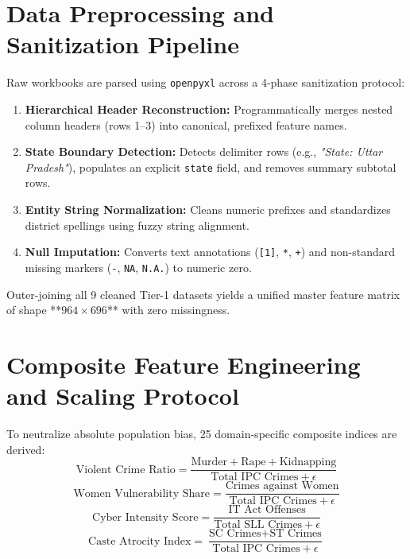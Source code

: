 \documentclass[12pt,a4paper]{report}
\begin{document}
\section{Data Preprocessing and Sanitization Pipeline}
Raw workbooks are parsed using \texttt{openpyxl} across a 4-phase sanitization protocol:
\begin{enumerate}[leftmargin=*]
    \item \textbf{Hierarchical Header Reconstruction:} Programmatically merges nested column headers (rows 1--3) into canonical, prefixed feature names.
    \item \textbf{State Boundary Detection:} Detects delimiter rows (e.g., \textit{"State: Uttar Pradesh"}), populates an explicit \texttt{state} field, and removes summary subtotal rows.
    \item \textbf{Entity String Normalization:} Cleans numeric prefixes and standardizes district spellings using fuzzy string alignment.
    \item \textbf{Null Imputation:} Converts text annotations (\texttt{[1]}, \texttt{*}, \texttt{+}) and non-standard missing markers (\texttt{-}, \texttt{NA}, \texttt{N.A.}) to numeric zero.
\end{enumerate}
Outer-joining all 9 cleaned Tier-1 datasets yields a unified master feature matrix of shape **$964 \times 696$** with zero missingness.

\section{Composite Feature Engineering and Scaling Protocol}
To neutralize absolute population bias, 25 domain-specific composite indices are derived:
\begin{equation}
\text{Violent Crime Ratio} = \frac{\text{Murder} + \text{Rape} + \text{Kidnapping}}{\text{Total IPC Crimes} + \epsilon}
\end{equation}
\begin{equation}
\text{Women Vulnerability Share} = \frac{\text{Crimes against Women}}{\text{Total IPC Crimes} + \epsilon}
\end{equation}
\begin{equation}
\text{Cyber Intensity Score} = \frac{\text{IT Act Offenses}}{\text{Total SLL Crimes} + \epsilon}
\end{equation}
\begin{equation}
\text{Caste Atrocity Index} = \frac{\text{SC Crimes} + \text{ST Crimes}}{\text{Total IPC Crimes} + \epsilon}
\end{equation}
\end{document}
